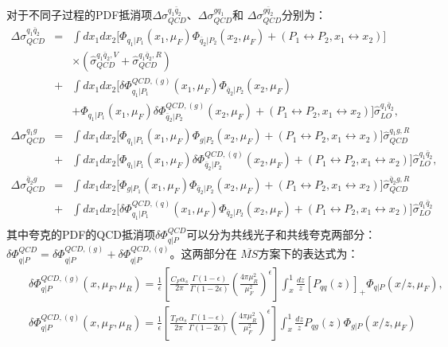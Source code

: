 对于不同子过程的PDF抵消项$\Delta \sigma^{q_1\bar{q}_2}_{QCD}$、$\Delta \sigma^{gq_1}_{QCD}$和
$\Delta \sigma^{g\bar{q}_2}_{QCD}$分别为：
\begin{eqnarray}
\Delta \sigma^{q_1\bar{q}_2}_{QCD}
&=&
\int dx_1 dx_2
\Big[
\Phi_{q_1|P_1}(x_1, \mu_F) \Phi_{\bar{q}_2|P_2}(x_2, \mu_F) + \left( P_1 \leftrightarrow P_2, x_1 \leftrightarrow x_2 \right)
\Big]
\nonumber \\
&& \times \left(
\hat{\sigma}_{QCD}^{q_1\bar{q}_2,V} + \hat{\sigma}_{QCD}^{q_1\bar{q}_2,R}
\right) \nonumber \\
&+&
\int dx_1 dx_2
\Big[
\delta \Phi^{QCD,(g)}_{q_1|P_1}(x_1, \mu_F) \Phi_{\bar{q}_2|P_2}(x_2, \mu_F)
\nonumber \\
&&
+
\Phi_{q_1|P_1}(x_1, \mu_F) \delta \Phi^{QCD,(g)}_{\bar{q}_2|P_2}(x_2, \mu_F) 
+ \left( P_1 \leftrightarrow P_2, x_1 \leftrightarrow x_2 \right)
\Big]
\hat{\sigma}_{LO}^{q_1\bar{q}_2}, 
\nonumber \\
\Delta \sigma^{q_1g}_{QCD}
&=&
\int dx_1 dx_2
\Big[
\Phi_{q_1|P_1}(x_1, \mu_F) \Phi_{g|P_2}(x_2, \mu_F) + \left( P_1 \leftrightarrow P_2, x_1 \leftrightarrow x_2 \right)
\Big]
\hat{\sigma}_{QCD}^{q_1g,R} \nonumber \\
&+&
\int dx_1 dx_2
\Big[
\Phi_{q_1|P_1}(x_1, \mu_F) \delta \Phi^{QCD,(q)}_{\bar{q}_2|P_2}(x_2, \mu_F) + \left( P_1 \leftrightarrow P_2, x_1 \leftrightarrow x_2 \right)
\Big]
\hat{\sigma}_{LO}^{q_1\bar{q}_2}, \nonumber \\
\Delta \sigma^{\bar{q}_2g}_{QCD}
&=&
\int dx_1 dx_2
\Big[
\Phi_{g|P_1}(x_1, \mu_F) \Phi_{\bar{q}_2|P_2}(x_2, \mu_F) + \left( P_1 \leftrightarrow P_2, x_1 \leftrightarrow x_2 \right)
\Big]
\hat{\sigma}_{QCD}^{\bar{q}_2g,R} \nonumber \\
&+&
\int dx_1 dx_2
\Big[
\delta \Phi^{QCD,(q)}_{q_1|P_1}(x_1, \mu_F) \Phi_{\bar{q}_2|P_2}(x_2, \mu_F) + \left( P_1 \leftrightarrow P_2, x_1 \leftrightarrow x_2 \right)
\Big]
\hat{\sigma}_{LO}^{q_1\bar{q}_2}
\nonumber \\
\end{eqnarray}
其中夸克的PDF的QCD抵消项$\delta \Phi^{QCD}_{q|P}$可以分为共线光子和共线夸克两部分：
$\delta \Phi^{QCD}_{q|P} = \delta \Phi_{q|P}^{QCD,(g)} + \delta \Phi^{QCD,(q)}_{q|P}$。这两部分在
$\overline{MS}$方案下的表达式为：
\begin{eqnarray}
&& \delta \Phi^{QCD,(g)}_{q|P}(x,\mu_F,\mu_R) =
   \frac{1}{\epsilon} \left[
                      \frac{C_F\alpha_s}{2 \pi}
                      \frac{\Gamma(1 - \epsilon)}{\Gamma(1 - 2 \epsilon)}
                      \left( \frac{4 \pi \mu_R^2}{\mu_F^2} \right)^{\epsilon}
                      \right]
   \int_x^1 \frac{dz}{z} \left[P_{qq}(z)\right]_+ \Phi_{q|P}(x/z,\mu_F), \nonumber \\
&& \delta \Phi^{QCD,(q)}_{q|P}(x,\mu_F,\mu_R) =
   \frac{1}{\epsilon} \left[
                      \frac{T_F\alpha_s}{2 \pi}
                      \frac{\Gamma(1 - \epsilon)}{\Gamma(1 - 2 \epsilon)}
                      \left( \frac{4 \pi \mu_R^2}{\mu_F^2} \right)^{\epsilon}
                      \right]
   \int_x^1 \frac{dz}{z} P_{qg}(z) \Phi_{g|P}(x/z,\mu_F)
\nonumber \\
\end{eqnarray}
